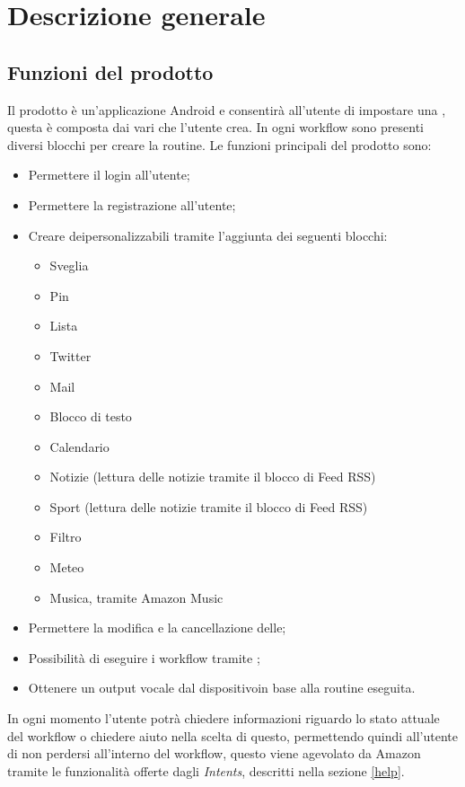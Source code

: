 \chapter{Descrizione generale} \label{DescrizioneGenerale}

\section{Funzioni del prodotto}
Il prodotto è un'applicazione Android e consentirà all'utente di impostare una , questa è composta dai vari  che l'utente crea. In ogni workflow sono presenti diversi blocchi per creare la routine. Le funzioni principali del prodotto sono:
\begin{itemize}
	\item Permettere il login all'utente;
	\item Permettere la registrazione all'utente;
	\item Creare deipersonalizzabili tramite l'aggiunta dei seguenti blocchi:
	\begin{itemize}
		\item Sveglia
		\item Pin
		\item Lista
		\item Twitter
		\item Mail
		\item Blocco di testo
		\item Calendario
		\item Notizie (lettura delle notizie tramite il blocco di Feed RSS)
		\item Sport (lettura delle notizie tramite il blocco di Feed RSS)
		\item Filtro
		\item Meteo
		\item Musica, tramite Amazon Music 
	\end{itemize}
	\item Permettere la modifica e la cancellazione delle;
	\item Possibilità di eseguire i workflow tramite ;
	\item Ottenere un output vocale dal dispositivoin base alla routine eseguita.
\end{itemize}
In ogni momento l'utente potrà chiedere informazioni riguardo lo stato attuale del workflow o chiedere aiuto nella scelta di questo, permettendo quindi all'utente di non perdersi all'interno del workflow, questo viene agevolato da Amazon tramite le funzionalità offerte dagli \textit{Intents}, descritti nella sezione \ref{help}.

